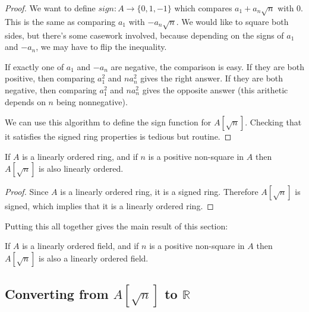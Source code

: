 \begin{proof}
  We want to define $sign : A → \{0,1,-1\}$ which compares $a_1 + a_n\sqrt{n}$
  with 0. This is the same as comparing $a_1$ with $-a_n\sqrt{n}$. We would
  like to square both sides, but there's some casework involved, because
  depending on the signs of $a_1$ and $-a_n$, we may have to flip the
  inequality.

  If exactly one of $a_1$ and $-a_n$ are negative, the comparison is easy. If they
  are both positive, then comparing $a_1^2$ and $na_n^2$ gives the right
  answer. If they are both negative, then comparing $a_1^2$ and $na_n^2$ gives
  the opposite answer (this arithetic depends on $n$ being nonnegative).

  We can use this algorithm to define the sign function for $A[\sqrt{n}]$.
  Checking that it satisfies the signed ring properties is tedious but routine.
\end{proof}

\begin{corollary}
  \label{thm:adjoinOrderedRing}
  \leanok
  If $A$ is a linearly ordered ring, and if $n$ is a positive non-square in $A$
  then $A[\sqrt{n}]$ is also linearly ordered.
\end{corollary}

\begin{proof}
  \leanok
  Since $A$ is a linearly ordered ring, it is a signed ring. Therefore $A[\sqrt{n}]$ is signed,
  which implies that it is a linearly ordered ring.
\end{proof}


Putting this all together gives the main result of this section:

\begin{theorem}
  \label{thm:adjoinOrderedField}
  \leanok

  If $A$ is a linearly ordered field, and if $n$ is a positive non-square in $A$
  then $A[\sqrt{n}]$ is also a linearly ordered field.
\end{theorem}

\subsection{Converting from $A[\sqrt{n}]$ to $ℝ$}

